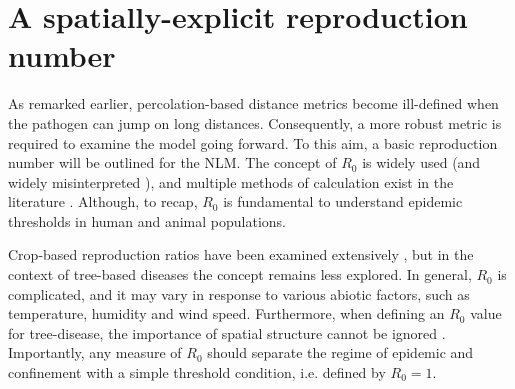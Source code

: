 
\section{A spatially-explicit reproduction number}
\label{sec:spatially-explicit-reproduction-ration}

As remarked earlier, percolation-based distance metrics become ill-defined when the pathogen can jump on long distances.
Consequently, a more robust metric is required to examine the model going forward.
To this aim, a basic reproduction number will be outlined for the NLM.
The concept of $R_0$ is widely used (and widely misinterpreted \cite{delamater2019complexity}),
and multiple methods of calculation exist in the literature \cite{perspectives-on-r0}.
Although, to recap, $R_0$ is fundamental to understand epidemic thresholds in human and animal populations. 

Crop-based reproduction ratios have been examined extensively
\cite{gubbins2000population, park2001invasion, doi:10.1146/annurev.phyto.011108.135838, van2011periodic},
but in the context of tree-based diseases the concept remains less explored. 
In general, $R_0$ is complicated, and it may vary in response to various abiotic factors, such as temperature, humidity and wind speed.
Furthermore, when defining an $R_0$ value for tree-disease, the importance of spatial structure cannot be
ignored \cite{park2001invasion}.
Importantly, any measure of $R_0$ should separate the regime of epidemic and confinement with a simple threshold condition, i.e. defined by $R_0=1$.


